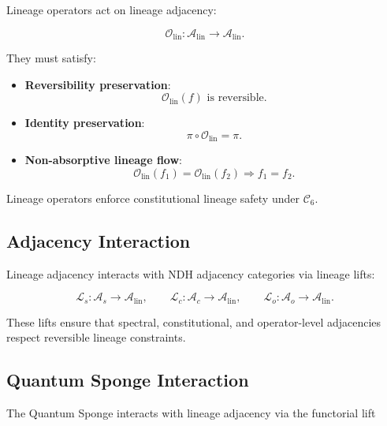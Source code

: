 Lineage operators act on lineage adjacency:

\[
\mathcal{O}_{\mathrm{lin}} :
\mathcal{A}_{\mathrm{lin}} \to \mathcal{A}_{\mathrm{lin}}.
\]

They must satisfy:

\begin{itemize}
    \item \textbf{Reversibility preservation}:
    \[
    \mathcal{O}_{\mathrm{lin}}(f) \text{ is reversible}.
    \]

    \item \textbf{Identity preservation}:
    \[
    \pi \circ \mathcal{O}_{\mathrm{lin}} = \pi.
    \]

    \item \textbf{Non-absorptive lineage flow}:
    \[
    \mathcal{O}_{\mathrm{lin}}(f_1) = \mathcal{O}_{\mathrm{lin}}(f_2)
    \Rightarrow f_1 = f_2.
    \]
\end{itemize}

Lineage operators enforce constitutional lineage safety under $\mathcal{C}_6$.


\subsection{Adjacency Interaction}

Lineage adjacency interacts with NDH adjacency categories via lineage lifts:

\[
\mathcal{L}_s : \mathcal{A}_s \to \mathcal{A}_{\mathrm{lin}}, \qquad
\mathcal{L}_c : \mathcal{A}_c \to \mathcal{A}_{\mathrm{lin}}, \qquad
\mathcal{L}_o : \mathcal{A}_o \to \mathcal{A}_{\mathrm{lin}}.
\]

These lifts ensure that spectral, constitutional, and operator-level
adjacencies respect reversible lineage constraints.


\subsection{Quantum Sponge Interaction}

The Quantum Sponge interacts with lineage adjacency via the functorial lift

